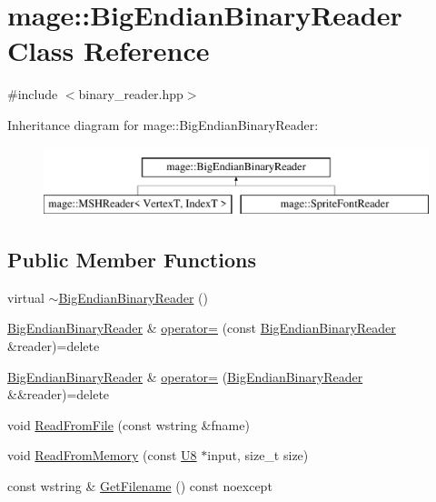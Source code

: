 \hypertarget{classmage_1_1_big_endian_binary_reader}{}\section{mage\+:\+:Big\+Endian\+Binary\+Reader Class Reference}
\label{classmage_1_1_big_endian_binary_reader}


{\ttfamily \#include $<$binary\+\_\+reader.\+hpp$>$}

Inheritance diagram for mage\+:\+:Big\+Endian\+Binary\+Reader\+:\begin{figure}[H]
\begin{center}
\leavevmode
\includegraphics[height=2.000000cm]{classmage_1_1_big_endian_binary_reader}
\end{center}
\end{figure}
\subsection*{Public Member Functions}
\begin{DoxyCompactItemize}
\item 
virtual \hyperlink{classmage_1_1_big_endian_binary_reader_ae85a40e8ed06e8c887e38d914843b8d3}{$\sim$\+Big\+Endian\+Binary\+Reader} ()
\item 
\hyperlink{classmage_1_1_big_endian_binary_reader}{Big\+Endian\+Binary\+Reader} \& \hyperlink{classmage_1_1_big_endian_binary_reader_abd4b24df4219469a8c2e9253b1cad405}{operator=} (const \hyperlink{classmage_1_1_big_endian_binary_reader}{Big\+Endian\+Binary\+Reader} \&reader)=delete
\item 
\hyperlink{classmage_1_1_big_endian_binary_reader}{Big\+Endian\+Binary\+Reader} \& \hyperlink{classmage_1_1_big_endian_binary_reader_a9e2e0dd62afff04774d0246f7e5e4ce4}{operator=} (\hyperlink{classmage_1_1_big_endian_binary_reader}{Big\+Endian\+Binary\+Reader} \&\&reader)=delete
\item 
void \hyperlink{classmage_1_1_big_endian_binary_reader_aec453e82d9b318e04894d4168db23715}{Read\+From\+File} (const wstring \&fname)
\item 
void \hyperlink{classmage_1_1_big_endian_binary_reader_a44d2529136499412cdaf9ad5d1cf0e59}{Read\+From\+Memory} (const \hyperlink{namespacemage_afc638980bc6154f15af5e2d93a0e0ea9}{U8} $\ast$input, size\+\_\+t size)
\item 
const wstring \& \hyperlink{classmage_1_1_big_endian_binary_reader_a801558f27606dbc681809178aaaaacd1}{Get\+Filename} () const noexcept
\end{DoxyCompactItemize}
